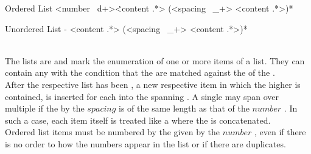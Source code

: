 \begin{identifier}{Ordered List}
<number ~d+>\.<content .*>
(<spacing ~_+> <content .*>)*
\end{identifier}
\begin{identifier}{Unordered List}
- <content .*>
(<spacing ~_+> <content .*>)*
\end{identifier}
 \\

The lists are  and mark the enumeration of one or more items of a list. They can contain any  with the condition that the  are matched against the  of the . \\

After the respective list  has been , a new respective item  in which the higher   is contained, is inserted for each  into the spanning . A single  may span over multiple  if the   by the \inline$spacing$  is of the same length as that of the \inline$number$ . In such a case, each item  itself is treated like a  where the  is concatenated. \\

Ordered list items must be numbered by the  given by the \inline$number$ , even if there is no order to how the numbers appear in the list or if there are duplicates. \\


